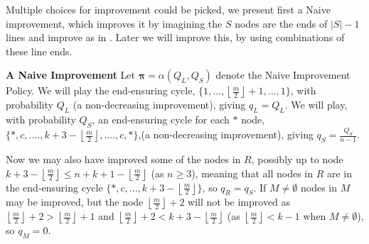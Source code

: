 \documentclass[a4paper,10pt]{article}
\newcommand{\halflength}{\ensuremath{\floor{\frac{m}{2}}}}
\newcommand{\floor}[1]{\left \lfloor #1 \right \rfloor}
\theoremstyle{definition}
\theoremstyle{definition}
\theoremstyle{remark}
\theoremstyle{definition}
\begin{document}
Multiple choices for improvement could be picked, we present first a Naive improvement, which improves it by imagining the $S$ nodes are the ends of $|S|-1$ lines and improve as in \citep{Papadaki2016}. Later we will improve this, by using combinations of these line ends.

\textbf{A Naive Improvement}
Let $\bm{\pi}=\alpha(Q_{L},Q_{S})$ denote the Naive Improvement Policy.
We will play the end-ensuring cycle, $\{1,...,\floor{\frac{m}{2}}+1,...,1\}$, with probability $Q_{L}$ (a non-decreasing improvement), giving $q_{L}=Q_{L}$. We will play,  with probability $Q_{S}$, an end-ensuring cycle for each $*$ node, $\{*,c,....,k+3-\floor{\frac{m}{2}},....,c,* \}$,(a non-decreasing improvement), giving $q_{S}=\frac{Q_{S}}{n-1}$.
 
Now we may also have improved some of the nodes in $R$, possibly up to node $k+3-\floor{\frac{m}{2}} \leq n+k+1-\floor{\frac{m}{2}}$ (as $n \geq 3$), meaning that all nodes in $R$ are in the end-ensuring cycle $\{*,c,...,k+3-\floor{\frac{m}{2}} \}$, so $q_{R}=q_{S}$. If $M \neq \emptyset$ nodes in $M$ may be improved, but the node $\halflength +2$ will not be improved as  $\halflength +2 > \halflength +1$ and $\halflength +2 < k+3- \halflength$ (as $\halflength < k-1$ when $M \neq \emptyset$), so $q_{M}=0$.
\end{document}

